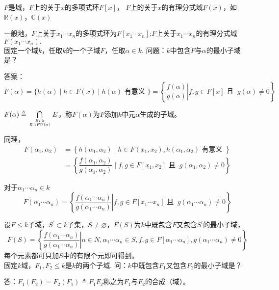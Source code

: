 \documentclass[UTF8]{article}
\begin{document}
$F$是域，$F$上的关于$x$的多项式环$F[x]$，
$F$上的关于$x$的有理分式域$F(x)$，如$\mathbb{R}(x)$，$\mathbb{C}(x)$

一般地，$F$上关于$x_{1} \cdots x_{n}$的多项式环为$F[x_{1} \cdots x_{n}]$;$F$上关于$x_{1} \cdots x_{n}$的有理分式域$F(x_{1} \cdots x_{n}).$\\

固定一个域$k$，任取$k$的一个子域$F$，任取$\alpha\in k$.
问题：$k$中包含$F$与$\alpha$的最小子域是？

答案：$F(\alpha)=\{h(\alpha) \mid h \in F(x) \mid h(\alpha)\text{  有意义 }\}=\left\{ \left.\dfrac{f(\alpha)}{g(\alpha)}\right| f,g\in F[x]\text{ 且 }\ g(\alpha)\neq 0\right\}$

\hspace{11pt}$F(\alpha) \triangleq\bigcap\limits_{E\in k\atop E\supset FU(\alpha)}E$，称$F(\alpha)$为$F$添加$k$中元$\alpha$生成的子域。

同理，
$$
\begin{aligned}
F\left( \alpha_1,\alpha_2\right)&=\left\{ h\left(\alpha_{1}, \alpha_{2}\right) \mid h \in F\left(x_{1}, x_{2}\right), h\left(\alpha_{1}, \alpha_{2}\right)\text{ 有意义 }\right\}\\ 
&=\left\{ \dfrac{f(\alpha_1, \alpha_2)}{g(\alpha_1, \alpha_2)}\mid f, g \in F\left[x_{1}, x_{2}\right]\text{ 且 }\ g(\alpha_1, \alpha_2) \neq 0\right\}
\end{aligned}
$$

对于$\alpha_{1} \cdots \alpha_{n} \in k$
$$
F\left( \alpha_{1} \cdots \alpha_{n}\right)=\left\{ \left.\dfrac{f\left( \alpha_{1} \cdots \alpha_{n}\right)}{g\left( \alpha_{1} \cdots \alpha_{n}\right)}\right| f,g\in F\left[ x_{1} \cdots x_{n}\right]\text{ 且 }\ g\left( \alpha_{1} \cdots \alpha_{n}\right)\neq 0\right\}
$$

设$F\leqslant k$子域，$S^{\prime}\subset k$子集，$S\neq\varnothing$，$F(S)$为$k$中既包含$F$又包含$S^{\prime}$的最小子域，
$$
F(S)=\left\{ \left. \dfrac{f\left( \alpha_{1} \cdots \alpha_{n}\right)}{g\left( \alpha_{1} \cdots \alpha_{n}\right)}\right| n\in N, \alpha_{1} \cdots \alpha_{n}\in S, f,g\in F\left[\alpha_{1} \cdots \alpha_{n}\right], g\left( \alpha_{1} \cdots \alpha_{n}\right)\neq 0\right\}
$$
每个元素都可只加$S$中的有限个元即可得到。\\


固定$k$域，$F_1,F_{2} \leq k$是$k$的两个子域.
问：$k$中既包含$F_1$又包含$F_2$的最小子域是？

答：$F_{1}\left(F_{2}\right)=F_{2}\left(F_{1}\right)\triangleq F_1F_2$称之为$F_1$与$F_2$的合成（域）。
\end{document}

